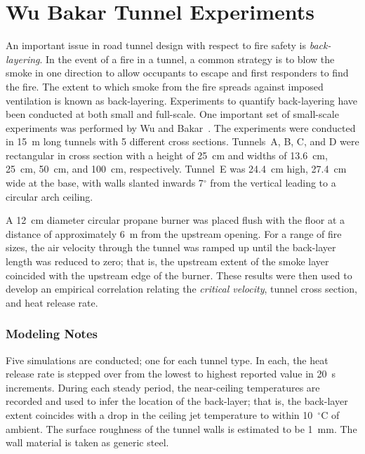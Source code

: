 \section{Wu Bakar Tunnel Experiments}
\label{Wu_Bakar_Tunnels_Description}

An important issue in road tunnel design with respect to fire safety is {\em back-layering}. In the event of a fire in a tunnel, a common strategy is to blow the smoke in one direction to allow occupants to escape and first responders to find the fire. The extent to which smoke from the fire spreads against imposed ventilation is known as back-layering. Experiments to quantify back-layering have been conducted at both small and full-scale. One important set of small-scale experiments was performed by Wu and Bakar~\cite{Wu:FSJ2000}. The experiments were conducted in 15~m long tunnels with 5 different cross sections. Tunnels~A, B, C, and D were rectangular in cross section with a height of 25~cm and widths of 13.6~cm, 25~cm, 50~cm, and 100~cm, respectively. Tunnel~E was 24.4~cm high, 27.4~cm wide at the base, with walls slanted inwards 7$^\circ$ from the vertical leading to a circular arch ceiling.

A 12~cm diameter circular propane burner was placed flush with the floor at a distance of approximately 6~m from the upstream opening. For a range of fire sizes, the air velocity through the tunnel was ramped up until the back-layer length was reduced to zero; that is, the upstream extent of the smoke layer coincided with the upstream edge of the burner. These results were then used to develop an empirical correlation relating the {\em critical velocity}, tunnel cross section, and heat release rate.

\subsubsection{Modeling Notes}

Five simulations are conducted; one for each tunnel type. In each, the heat release rate is stepped over from the lowest to highest reported value in 20~s increments. During each steady period, the near-ceiling temperatures are recorded and used to infer the location of the back-layer; that is, the back-layer extent coincides with a drop in the ceiling jet temperature to within 10~$^\circ$C of ambient. The surface roughness of the tunnel walls is estimated to be 1~mm. The wall material is taken as generic steel.


\FloatBarrier


